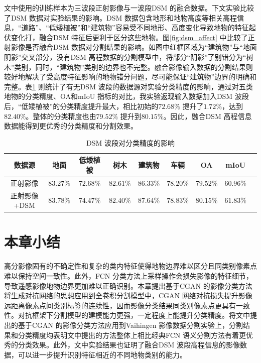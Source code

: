 文中使用的训练样本为三波段正射影像与一波段DSM 的融合数据。下文实验比较了DSM 数据对实验结果的影响。DSM 数据包含地形和地物高度等相关高程信息，“道路”、“低矮植被”和“建筑物”容易受不同地形、高度变化导致地物的特征起伏变化打，融合DSM 特征后更利于区分这些地物。图\ref{fig:dsm_affect} 中比较了正射影像是否融合DSM 数据对分割结果的影响。如图中红框区域为“建筑物”与“地面阴影”交叉部分，没有DSM 高程数据的分割模型中，将部分“阴影”了别错分为“树木”类别，同时，“建筑物”类别的边界也不完整。融合影像输入数据的分割结果则较好地解决了受高度特征影响的地物错分问题，尽可能保证“建筑物”边界的明确和完整。表\ref{tab:dsm_affect} 则统计了有无DSM 波段的数据源对实验分类精度的影响，通过对五类地物的分类精度、OA和mIoU 指标的对比，我实验返现输入数据加入DSM 波段后，“低矮植被”的分类精度提升最大，相比初始的$72.68\%$ 提升了$1.72\%$，达到$82.40\%$。整体的分类精度也由$79.52\%$ 提升到$80.15\%$。因此，融合DSM 高程信息数据能得到更优秀的分类精度和分割效果。

\begin{table}[htbp]
  \caption{DSM 波段对分类精度的影响}\label{tab:dsm_affect}
  \centering
  \begin{tabular}{ccccccccc}
    \toprule
    数据源       & 地面      & 低矮植被  & 树木      & 建筑物    & 车辆      & OA        & mIoU               \\
    \midrule
    正射影像     & $83.27\%$ & $72.68\%$ & $82.61\%$ & $86.33\%$ & $78.20\%$ & $79.52\%$ & $60.96\%$          \\
    正射影像+DSM & $83.78\%$ & $74.47\%$ & $82.40\%$ & $87.64\%$ & $78.83\%$ & $80.15\%$ & \textbf{$61.83\%$} \\
    \bottomrule
  \end{tabular}
\end{table}

\section{本章小结}
\label{sec:forth}
高分影像固有的不确定性和复杂的类内特征使得地物边界难以区分且同类别像素点难以保持空间一致性。此外，FCN 分类方法上采样操作会损失影像的特征细节，导致遥感影像地物边界更加难以正确识别。本章提出基于CGAN 的影像分类方法将生成对抗网络的思想应用到全卷积分割模型中，CGAN 网络对抗损失提升影像远距离像素点间类别标签的连续性，因而影像分类结果同类别像素点更具有一致性。对抗框架下分割模型的建模能力更强，一定程度上能提升分类精度。将文中提出的基于CGAN 的影像分类方法应用到Vaihingen 影像数据分割实验上，分割结果和分类精度均表明文中提出的方法整体上相比经典FCN 语义分割方法有着更优秀的分类效果。此外，文中实验结果也证明了融合DSM 波段高程信息的影像数据，可以进一步提升识别特征相近的不同地物类别的能力。
